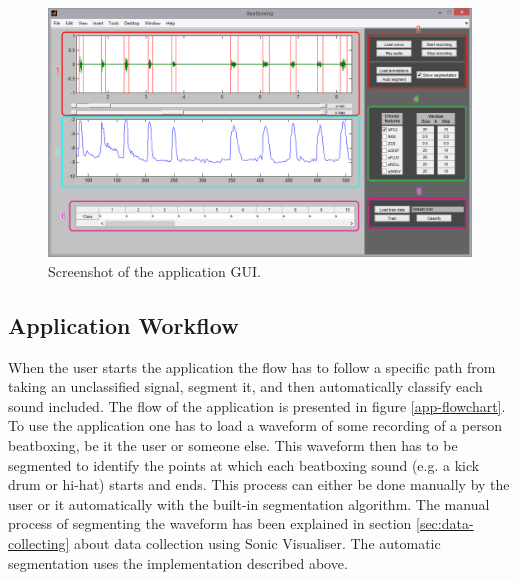 \begin{figure}
\begin{center}
\includegraphics[width=\textwidth]{fig/Application.png}
\caption{Screenshot of the application GUI.}
\label{app-gui}
\end{center}
\end{figure}

\subsection{Application Workflow}
When the user starts the application the flow has to follow a specific path from taking an unclassified signal, segment it, and then automatically classify each sound included. The flow of the application is presented in figure \ref{app-flowchart}. To use the application one has to load a waveform of some recording of a person beatboxing, be it the user or someone else. This waveform then has to be segmented to identify the points at which each beatboxing sound (e.g. a kick drum or hi-hat) starts and ends. This process can either be done manually by the user or it automatically with the built-in segmentation algorithm. The manual process of segmenting the waveform has been explained in section \ref{sec:data-collecting} about data collection using Sonic Visualiser. The automatic segmentation uses the implementation described above.

